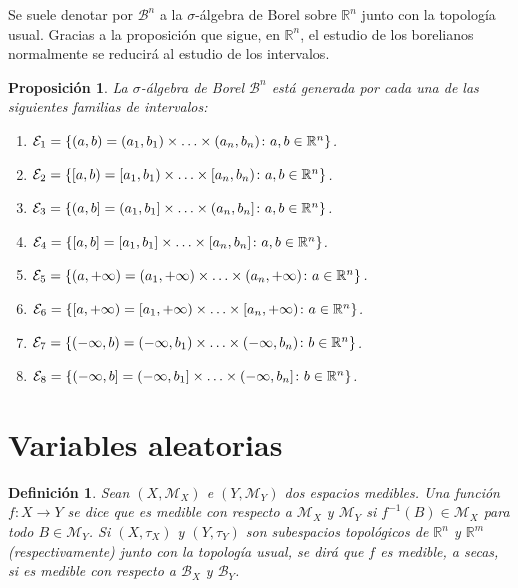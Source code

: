 \documentclass[11pt]{report}
\newtheorem{proposition}{Proposición}
\newtheorem{definition}{Definición}
\theoremstyle{definition}
\newcommand{\R}{\mathbb R}
\begin{document}
Se suele denotar por $\mathcal{B}^n$ a la $\sigma$-álgebra de Borel sobre $\R^n$ junto con la topología usual. Gracias a la proposición que sigue, en $\R^n$, el estudio de los borelianos normalmente se reducirá al estudio de los intervalos.

\begin{proposition}
La $\sigma$-álgebra de Borel $\mathcal{B}^n$ está generada por cada una de las siguientes familias de intervalos:
\begin{enumerate}
    \item $\mathcal{E}_1 = \{(a,b) = (a_1,b_1) \times \mathellipsis \times (a_n,b_n) \colon a,b \in \R^n\}$.
    \item $\mathcal{E}_2 = \{[a,b) = [a_1,b_1) \times \mathellipsis \times [a_n,b_n) \colon a,b \in \R^n\}$.
    \item $\mathcal{E}_3 = \{(a,b] = (a_1,b_1] \times \mathellipsis \times (a_n,b_n] \colon a,b \in \R^n\}$.
    \item $\mathcal{E}_4 = \{[a,b] = [a_1,b_1] \times \mathellipsis \times [a_n,b_n] \colon a,b \in \R^n\}$.
    \item $\mathcal{E}_5 = \{(a,+\infty) = (a_1,+\infty) \times \mathellipsis \times (a_n,+\infty) \colon a \in \R^n\}$.
    \item $\mathcal{E}_6 = \{[a,+\infty) = [a_1,+\infty) \times \mathellipsis \times [a_n,+\infty) \colon a \in \R^n\}$.
    \item $\mathcal{E}_7 = \{(-\infty,b) = (-\infty,b_1) \times \mathellipsis \times (-\infty,b_n) \colon b \in \R^n\}$.
    \item $\mathcal{E}_8 = \{(-\infty,b] = (-\infty,b_1] \times \mathellipsis \times (-\infty,b_n] \colon b \in \R^n\}$.
\end{enumerate}
\end{proposition}

\section{Variables aleatorias}

\begin{definition}
Sean $(X,\mathcal{M}_X)$ e $(Y,\mathcal{M}_Y)$ dos espacios medibles. Una función $f \colon X \to Y$ se dice que es \emph{medible con respecto a $\mathcal{M}_X$ y $\mathcal{M}_Y$} si $f^{-1}(B) \in \mathcal{M}_X$ para todo $B \in \mathcal{M}_Y$. Si $(X,\tau_X)$ y $(Y,\tau_Y)$ son subespacios topológicos de $\R^n$ y $\R^m$ (respectivamente) junto con la topología usual, se dirá que $f$ es \emph{medible}, a secas, si es medible con respecto a $\mathcal{B}_X$ y $\mathcal{B}_Y$.
\end{definition}
\end{document}
